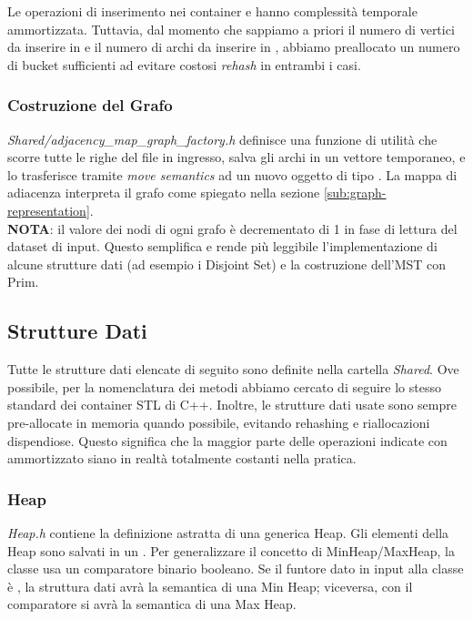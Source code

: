 \noindent Le operazioni di inserimento nei container  e  hanno complessità temporale \complexityConstant{} ammortizzata. Tuttavia, dal momento che sappiamo a priori il numero di vertici da inserire in  e il numero di archi da inserire in , abbiamo preallocato un numero di bucket sufficienti ad evitare costosi \textit{rehash} in entrambi i casi.

\subsubsection {Costruzione del Grafo}

\textit{Shared/adjacency\_map\_graph\_factory.h} definisce una funzione di utilità che scorre tutte le righe del file in ingresso, salva gli archi in un vettore temporaneo, e lo trasferisce tramite \textit{move semantics} ad un nuovo oggetto di tipo . La mappa di adiacenza interpreta il grafo come spiegato nella sezione \ref{sub:graph-representation}. \\

\noindent \textbf{NOTA}: il valore dei nodi di ogni grafo è decrementato di 1 in fase di lettura del dataset di input.
Questo semplifica e rende più leggibile l'implementazione di alcune strutture dati (ad esempio i Disjoint Set) e la costruzione dell'MST con Prim.

\subsection{Strutture Dati}

Tutte le strutture dati elencate di seguito sono definite nella cartella \textit{Shared}.
Ove possibile, per la nomenclatura dei metodi abbiamo cercato di seguire lo stesso standard dei container STL di C++.
Inoltre, le strutture dati usate sono sempre pre-allocate in memoria quando possibile, evitando rehashing e riallocazioni dispendiose. Questo significa che la maggior parte delle operazioni indicate con \complexityConstant{} ammortizzato siano in realtà totalmente costanti nella pratica.

\subsubsection{Heap}

\textit{Heap.h} contiene la definizione astratta di una generica Heap.
Gli elementi della Heap sono salvati in un .
Per generalizzare il concetto di MinHeap/MaxHeap, la classe usa un comparatore binario booleano. Se il funtore dato in input alla classe è
, la struttura dati avrà la semantica di una Min Heap; viceversa, con il comparatore  si avrà la semantica di una Max Heap.

